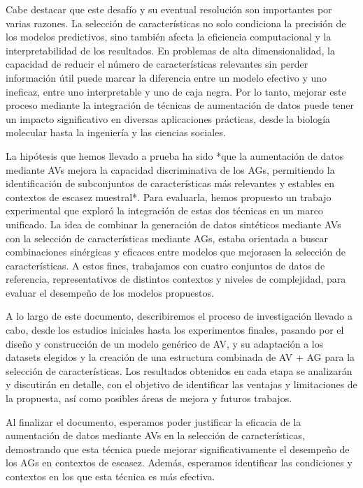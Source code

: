 Cabe destacar que este desafío y su eventual resolución son importantes por varias razones. La selección de características no solo condiciona la precisión de los modelos predictivos, sino también afecta la eficiencia computacional y la interpretabilidad de los resultados. En problemas de alta dimensionalidad, la capacidad de reducir el número de características relevantes sin perder información útil puede marcar la diferencia entre un modelo efectivo y uno ineficaz, entre uno interpretable y uno de caja negra. Por lo tanto, mejorar este proceso mediante la integración de técnicas de aumentación de datos puede tener un impacto significativo en diversas aplicaciones prácticas, desde la biología molecular hasta la ingeniería y las ciencias sociales.

La hipótesis que hemos llevado a prueba ha sido *que la aumentación de datos mediante AVs mejora la capacidad discriminativa de los AGs, permitiendo la identificación de subconjuntos de características más relevantes y estables en contextos de escasez muestral*. Para evaluarla, hemos propuesto un trabajo experimental que exploró la integración de estas dos técnicas en un marco unificado. La idea de combinar la generación de datos sintéticos mediante AVs con la selección de características mediante AGs, estaba orientada a buscar combinaciones sinérgicas y eficaces entre modelos que mejorasen la selección de características. A estos fines, trabajamos con cuatro conjuntos de datos de referencia, representativos de distintos contextos y niveles de complejidad, para evaluar el desempeño de los modelos propuestos.

A lo largo de este documento, describiremos el proceso de investigación llevado a cabo, desde los estudios iniciales hasta los experimentos finales, pasando por el diseño y construcción de un modelo genérico de AV, y su adaptación a los datasets elegidos y la creación de una estructura combinada de AV + AG para la selección de características. Los resultados obtenidos en cada etapa se analizarán y discutirán en detalle, con el objetivo de identificar las ventajas y limitaciones de la propuesta, así como posibles áreas de mejora y futuros trabajos.

Al finalizar el documento, esperamos poder justificar la eficacia de la aumentación de datos mediante AVs en la selección de características, demostrando que esta técnica puede mejorar significativamente el desempeño de los AGs en contextos de escasez. Además, esperamos identificar las condiciones y contextos en los que esta técnica es más efectiva.

